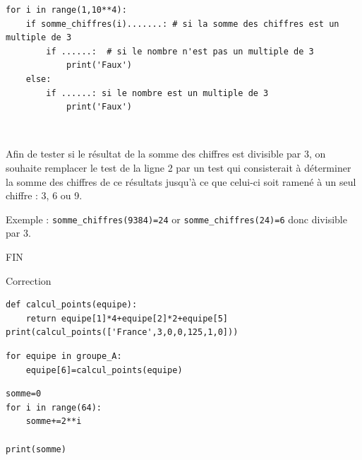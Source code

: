 \begin{verbatim}
for i in range(1,10**4):
    if somme_chiffres(i).......: # si la somme des chiffres est un multiple de 3
        if ......:  # si le nombre n'est pas un multiple de 3
            print('Faux')
    else:
        if ......: si le nombre est un multiple de 3
            print('Faux')
\end{verbatim}


~\

Afin de tester si le résultat de la somme des chiffres est divisible par 3, on souhaite remplacer le test de la ligne 2 par un test qui consisterait à déterminer la somme des chiffres de ce résultats jusqu'à ce que celui-ci soit ramené à un seul chiffre : 3, 6 ou 9.

Exemple : \texttt{somme\_chiffres(9384)=24} or \texttt{somme\_chiffres(24)=6} donc divisible par 3.



\begin{center}
\Large{FIN}
\end{center}

\cleardoublepage

\ifdef{\public}{}{\pagestyle{correction}}


\begin{center}
\Large{Correction}
\end{center}

\reponse{}

\begin{verbatim}
def calcul_points(equipe):
    return equipe[1]*4+equipe[2]*2+equipe[5]
print(calcul_points(['France',3,0,0,125,1,0]))
\end{verbatim}

\reponse{}
\begin{verbatim}
for equipe in groupe_A:
    equipe[6]=calcul_points(equipe)
\end{verbatim}

\reponse{}

\begin{verbatim}
somme=0
for i in range(64):
    somme+=2**i

print(somme)
\end{verbatim}

\reponse{}

